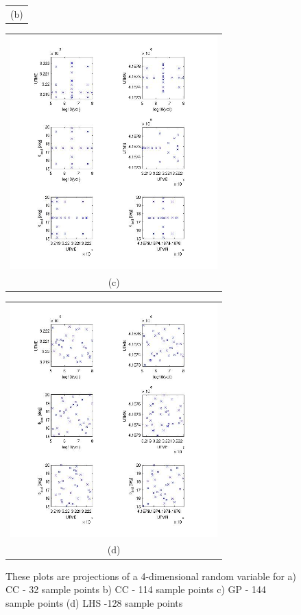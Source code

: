 \documentclass{article}
\newcommand{\Pic}[2][0.85]{\begin{center}\texttt{[image: \#2]}
 \end{center} }
\begin{document}
\begin{figure}[H]
\begin{minipage}[b]{0.6\textwidth}
\begin{tabular}{c}
        (b)
        \end{tabular}
    \end{minipage}
    \begin{minipage}{0.6\textwidth}
        \begin{tabular}{c}
	\includegraphics[width=8cm,height=9cm,keepaspectratio]{fig/picsdistrib/Gauss_Patterson.jpg}\\
        (c)
        \end{tabular}
    \end{minipage}
   \begin{minipage}[c]{0.6\textwidth}
       \begin{tabular}{c}
       \includegraphics[width=8cm,height=9cm,keepaspectratio]{fig/picsdistrib/lhs_32.jpg}\\
        (d)
        \end{tabular}
    \end{minipage}
\caption{ These plots are projections of a 4-dimensional random variable for a) CC - 32 sample points
b) CC - 114 sample points c) GP - 144 sample points (d) LHS -128 sample points }
\label{fig4}  
\end{figure}
\end{document}
